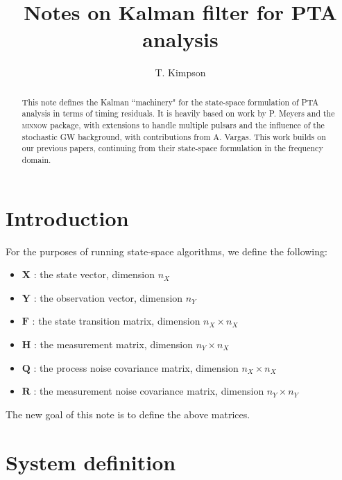 \documentclass[]{scrartcl}
\title{Notes on Kalman filter for PTA analysis}
\author{T. Kimpson}
\begin{document}
\maketitle
\begin{abstract}
	This note defines the Kalman ``machinery" for the state-space formulation of PTA analysis in terms of timing residuals. It is heavily based on work by P. Meyers and the \textsc{minnow} package, with extensions to handle multiple pulsars and the influence of the stochastic GW background, with contributions from A. Vargas. This work builds on our previous papers, continuing from their state-space formulation in the frequency domain.
\end{abstract}

\section{Introduction}

For the purposes of running state-space algorithms, we define the following:

\begin{itemize}
	\item $\boldsymbol{X}$ : the state vector, dimension $n_X$
	\item $\boldsymbol{Y}$ : the observation vector, dimension $n_Y$
	\item $\boldsymbol{F}$ : the state transition matrix, dimension $n_X \times n_X$
	\item $\boldsymbol{H}$ : the measurement matrix, dimension $n_Y \times n_X$
	\item $\boldsymbol{Q}$ : the process noise covariance matrix, dimension $n_X \times n_X$
	\item $\boldsymbol{R}$ : the measurement noise covariance matrix, dimension $n_Y \times n_Y$
\end{itemize}

The new goal of this note is to define the above matrices. \newline 


\section{System definition}
\end{document}
